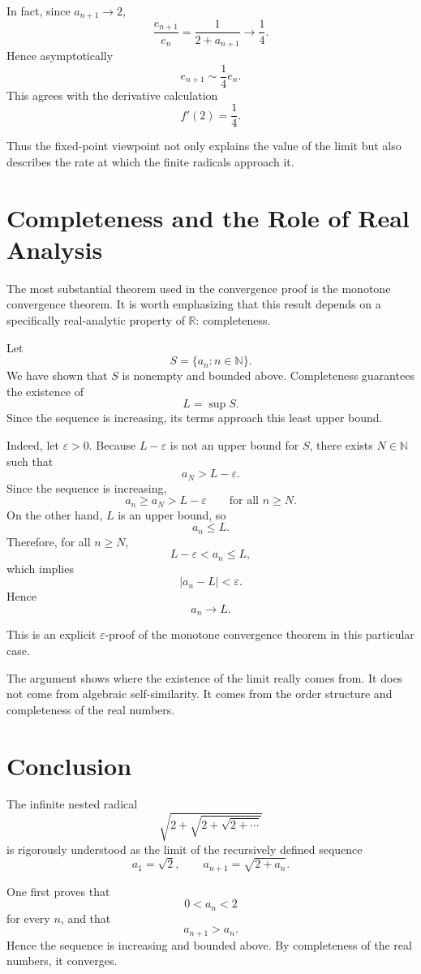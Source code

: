 \documentclass{essay}
\begin{document}
In fact, since \(a_{n+1}\to 2\),
\[ \frac{e_{n+1}}{e_{n}} = \frac{1}{2+a_{n+1}} \longrightarrow \frac{1}{4}. \]
Hence asymptotically
\[ e_{n+1}\sim \frac{1}{4} e_{n}. \]
This agrees with the derivative calculation
\[ f'(2)=\frac{1}{4}. \]

Thus the fixed-point viewpoint not only explains the value of the limit but also describes the rate at which the finite radicals approach it.

\section{Completeness and the Role of Real Analysis}

The most substantial theorem used in the convergence proof is the monotone convergence theorem. It is worth emphasizing that this result depends on a specifically real-analytic property of \(\mathbb{R}\): completeness.

Let
\[ S=\{a_{n}:n\in\mathbb{N}\}. \]
We have shown that \(S\) is nonempty and bounded above. Completeness guarantees the existence of
\[ L=\sup S. \]
Since the sequence is increasing, its terms approach this least upper bound.

Indeed, let \(\varepsilon>0\). Because \(L-\varepsilon\) is not an upper bound for \(S\), there exists \(N\in\mathbb{N}\) such that
\[ a_{N}>L-\varepsilon. \]
Since the sequence is increasing,
\[ a_{n}\geq a_{N}>L-\varepsilon \qquad \text{for all }n\geq N. \]
On the other hand, \(L\) is an upper bound, so
\[ a_{n}\leq L. \]
Therefore, for all \(n\geq N\),
\[ L-\varepsilon<a_{n}\leq L, \]
which implies
\[ |a_{n}-L|<\varepsilon. \]
Hence
\[ a_{n}\to L. \]

This is an explicit \(\varepsilon\)-proof of the monotone convergence theorem in this particular case.

The argument shows where the existence of the limit really comes from. It does not come from algebraic self-similarity. It comes from the order structure and completeness of the real numbers.

\section{Conclusion}

The infinite nested radical
\[ \sqrt{2+\sqrt{2+\sqrt{2+\cdots}}} \]
is rigorously understood as the limit of the recursively defined sequence
\[ a_{1}=\sqrt{2}, \qquad a_{n+1}=\sqrt{2+a_{n}}. \]

One first proves that
\[ 0<a_{n}<2 \]
for every \(n\), and that
\[ a_{n+1}>a_{n}. \]
Hence the sequence is increasing and bounded above. By completeness of the real numbers, it converges.
\end{document}
